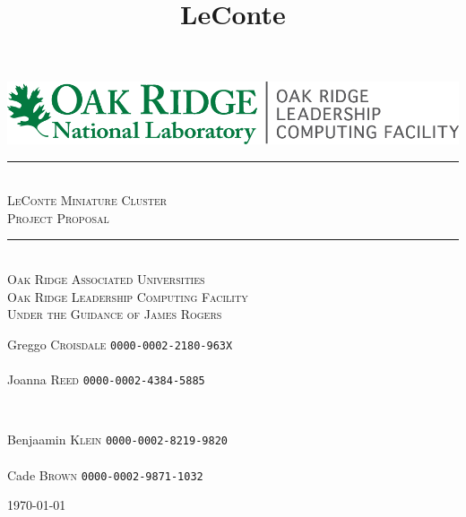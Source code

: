 \documentclass{article}
\title{LeConte}
\begin{document}
\begin{titlepage}
 \center
 \includegraphics[scale=1.5]{OLCF_color.png}\\[2cm]
 \newcommand{\sep}{\rule{\linewidth}{0.5mm}}
 \sep \\[0.4cm]
 \textsc{\huge LeConte Miniature Cluster}\\[0.4cm]
 \textsc{\large Project Proposal}\\[0.4cm]
 \sep \\[2cm]
 \textsc{\LARGE Oak Ridge Associated Universities}\\[0.5cm]
 \textsc{\Large Oak Ridge Leadership Computing Facility}\\[0.5cm]
 \textsc{\large Under the Guidance of James Rogers}\\[4.6cm]

\vfill
\begin{minipage}{0.4\textwidth}
\begin{flushleft} \large
Greggo \textsc{Croisdale} \texttt{0000-0002-2180-963X}\\~\\
Joanna \textsc{Reed} \texttt{0000-0002-4384-5885}\\
\end{flushleft}
\end{minipage}
~
\begin{minipage}{0.4\textwidth}
\begin{flushright} \large
Benjaamin \textsc{Klein} \texttt{0000-0002-8219-9820}\\~\\
Cade \textsc{Brown} \texttt{0000-0002-9871-1032}\\
\end{flushright}
\end{minipage}
{\large \vfill \vspace*{\fill} \today}
\end{titlepage}
\end{document}
